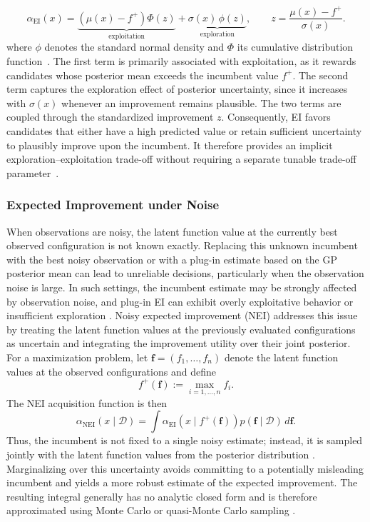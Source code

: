 \documentclass[12pt,a4paper]{report}
\begin{document}
        \[
        \alpha_{\mathrm{EI}}(x)
        =
        \underbrace{
        \left(\mu(x)-f^{+}\right)\Phi(z)
        }_{\text{exploitation}}
        +
        \underbrace{
        \sigma(x)\,\phi(z)
        }_{\text{exploration}},
        \qquad
        z=
        \frac{\mu(x)-f^{+}}{\sigma(x)}.
        \]
        where $\phi$ denotes the standard normal density and $\Phi$ its cumulative distribution function~\cite{jones1998efficient}. The first term is primarily associated with exploitation, as it rewards candidates whose posterior mean exceeds the incumbent value $f^{+}$. The second term captures the exploration effect of posterior uncertainty, since it increases with $\sigma(x)$ whenever an improvement remains plausible. The two terms are coupled through the standardized improvement $z$. Consequently, EI favors candidates that either have a high predicted value or retain sufficient uncertainty to plausibly improve upon the incumbent. It therefore provides an implicit exploration--exploitation trade-off without requiring a separate tunable trade-off parameter~\cite{jones1998efficient}.

        \subsubsection{Expected Improvement under Noise}
        When observations are noisy, the latent function value at the currently best observed configuration is not known exactly. Replacing this unknown incumbent with the best noisy observation or with a plug-in estimate based on the GP posterior mean can lead to unreliable decisions, particularly when the observation noise is large. In such settings, the incumbent estimate may be strongly affected by observation noise, and plug-in EI can exhibit overly exploitative behavior or insufficient exploration \cite{letham2019constrained}. Noisy expected improvement (NEI) addresses this issue by treating the latent function values at the previously evaluated configurations as uncertain and integrating the improvement utility over their joint posterior. For a maximization problem, let $\mathbf{f}=(f_1,\ldots,f_n)$ denote the latent function values at the observed configurations and define
        \[
        f^{+}(\mathbf{f}) := \max_{i=1,\ldots,n} f_i.
        \]
        The NEI acquisition function is then
        \[
        \alpha_{\mathrm{NEI}}(x\mid\mathcal{D})
        =
        \int
        \alpha_{\mathrm{EI}}\!\left(
        x\mid f^{+}(\mathbf{f})
        \right)
        p(\mathbf{f}\mid\mathcal{D})\,d\mathbf{f}.
        \]
        Thus, the incumbent is not fixed to a single noisy estimate; instead, it is
        sampled jointly with the latent function values from the posterior
        distribution \cite{letham2019constrained}. Marginalizing over this uncertainty
        avoids committing to a potentially misleading incumbent and yields a more
        robust estimate of the expected improvement. The resulting integral generally
        has no analytic closed form and is therefore approximated using Monte Carlo or
        quasi-Monte Carlo sampling \cite{letham2019constrained,balandat2019botorch}.
\end{document}
